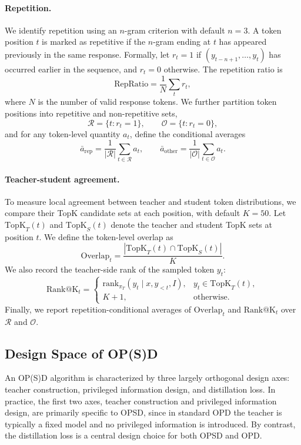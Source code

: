 \paragraph{Repetition.}
We identify repetition using an \(n\)-gram criterion with default \(n=3\). A token position \(t\) is marked as repetitive if the \(n\)-gram ending at \(t\) has appeared previously in the same response. Formally, let \(r_t=1\) if \((y_{t-n+1},\dots,y_t)\) has occurred earlier in the sequence, and \(r_t=0\) otherwise. The repetition ratio is
\[
\mathrm{RepRatio}=\frac{1}{N}\sum_t r_t,
\]
where \(N\) is the number of valid response tokens. We further partition token positions into repetitive and non-repetitive sets,
\[
\mathcal{R}=\{t:r_t=1\},\qquad \mathcal{O}=\{t:r_t=0\},
\]
and for any token-level quantity \(a_t\), define the conditional averages
\[
\bar a_{\mathrm{rep}}=\frac{1}{|\mathcal R|}\sum_{t\in\mathcal R} a_t,
\qquad
\bar a_{\mathrm{other}}=\frac{1}{|\mathcal O|}\sum_{t\in\mathcal O} a_t.
\]

\paragraph{Teacher-student agreement.}
To measure local agreement between teacher and student token distributions, we compare their TopK candidate sets at each position, with default \(K=50\). Let \(\mathrm{TopK}_T(t)\) and \(\mathrm{TopK}_S(t)\) denote the teacher and student TopK sets at position \(t\). We define the token-level overlap as
\[
\mathrm{Overlap}_t=\frac{|\mathrm{TopK}_T(t)\cap \mathrm{TopK}_S(t)|}{K}.
\]
We also record the teacher-side rank of the sampled token \(y_t\):
\[
\mathrm{Rank@K}_t=
\begin{cases}
\mathrm{rank}_{\pi_T}(y_t\mid x,y_{<t},I), & y_t\in \mathrm{TopK}_T(t),\\
K+1, & \text{otherwise}.
\end{cases}
\]
Finally, we report repetition-conditional averages of \(\mathrm{Overlap}_t\) and \(\mathrm{Rank@K}_t\) over \(\mathcal R\) and \(\mathcal O\).



\subsection{Design Space of OP(S)D}

An OP(S)D algorithm is characterized by three largely orthogonal design axes: teacher construction, privileged information design, and distillation loss. In practice, the first two axes, teacher construction and privileged information design, are primarily specific to OPSD, since in standard OPD the teacher is typically a fixed model and no privileged information is introduced. By contrast, the distillation loss is a central design choice for both OPSD and OPD.


